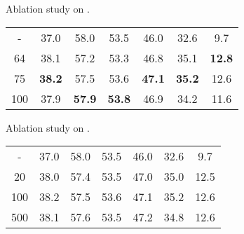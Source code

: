 \documentclass[runningheads]{llncs}
\begin{document}
\noindent
\begin{minipage}[!t]{\textwidth}
    \begin{minipage}{0.49\textwidth}
    \centering
    \makeatletter{}\makeatother\caption{Ablation study on .}
        \setlength{\tabcolsep}{1pt}
        \begin{tabular}{ccccccc}
        \toprule
         &  &  &  &  &  & \\
        \midrule
        - & 37.0 & 58.0 & 53.5 & 46.0 & 32.6 & 9.7\\
        \midrule
        64 & 38.1 & 57.2 & 53.3 & 46.8 & 35.1 & \textbf{12.8}\\
        75 & \textbf{38.2} & 57.5 & 53.6 & \textbf{47.1} & \textbf{35.2} & 12.6\\
        100 & 37.9 & \textbf{57.9} & \textbf{53.8} & 46.9 & 34.2 & 11.6\\
        \bottomrule
        \end{tabular}
        \label{tab:dynamic_label_assignment}
    \end{minipage}
    \begin{minipage}{0.5\textwidth}
    \centering
        \makeatletter{}\makeatother\caption{Ablation study on .}
        \setlength{\tabcolsep}{1pt}
        \begin{tabular}{ccccccc}
        \toprule
         &  &  &  &  &  & \\
        \midrule
        - & 37.0 & 58.0 & 53.5 & 46.0 & 32.6 & 9.7\\
        \midrule
        20 & 38.0 & 57.4 & 53.5 & 47.0 & 35.0 & 12.5\\
        100 & 38.2 & 57.5 & 53.6 & 47.1 & 35.2 & 12.6\\
        500 & 38.1 & 57.6 & 53.5 & 47.2 & 34.8 & 12.6\\
        \bottomrule
        \end{tabular}
        \label{tab:iteration_count}
    \end{minipage}
\end{minipage}
\end{document}
